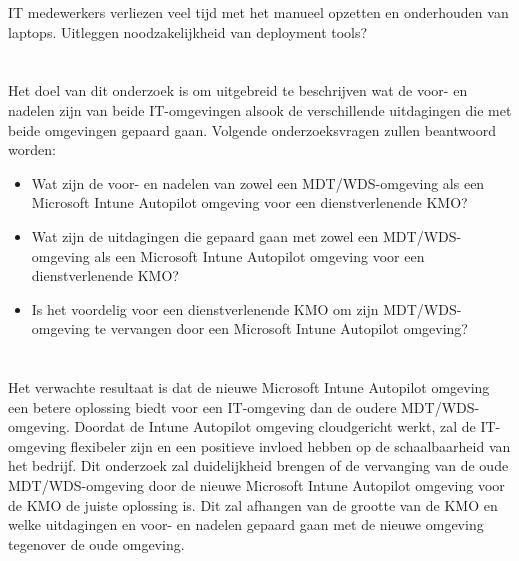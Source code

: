 IT medewerkers verliezen veel tijd met het manueel opzetten en onderhouden van laptops.
Uitleggen noodzakelijkheid van deployment tools?


\section{}
\label{sec:onderzoeksvraag}
Het doel van dit onderzoek is om uitgebreid te beschrijven wat de voor- en nadelen zijn van beide IT-omgevingen alsook de verschillende uitdagingen die met beide omgevingen gepaard gaan. Volgende onderzoeksvragen zullen beantwoord worden:

\begin{itemize}
    \item Wat zijn de voor- en nadelen van zowel een MDT/WDS-omgeving als een Microsoft Intune Autopilot omgeving voor een dienstverlenende KMO?
    \item Wat zijn de uitdagingen die gepaard gaan met zowel een MDT/WDS-omgeving als een Microsoft Intune Autopilot omgeving voor een dienstverlenende KMO?
    \item Is het voordelig voor een dienstverlenende KMO om zijn MDT/WDS-omgeving te vervangen door een Microsoft Intune Autopilot omgeving?
\end{itemize}


\section{}
\label{sec:onderzoeksdoelstelling}

Het verwachte resultaat is dat de nieuwe Microsoft Intune Autopilot omgeving een betere oplossing biedt voor een IT-omgeving dan de oudere MDT/WDS-omgeving. Doordat de Intune Autopilot omgeving cloudgericht werkt, zal de IT-omgeving flexibeler zijn en een positieve invloed hebben op de schaalbaarheid van het bedrijf. Dit onderzoek zal duidelijkheid brengen of de vervanging van de oude MDT/WDS-omgeving door de nieuwe Microsoft Intune Autopilot omgeving voor de KMO de juiste oplossing is. Dit zal afhangen van de grootte van de KMO en welke uitdagingen en voor- en nadelen gepaard gaan met de nieuwe omgeving tegenover de oude omgeving.

